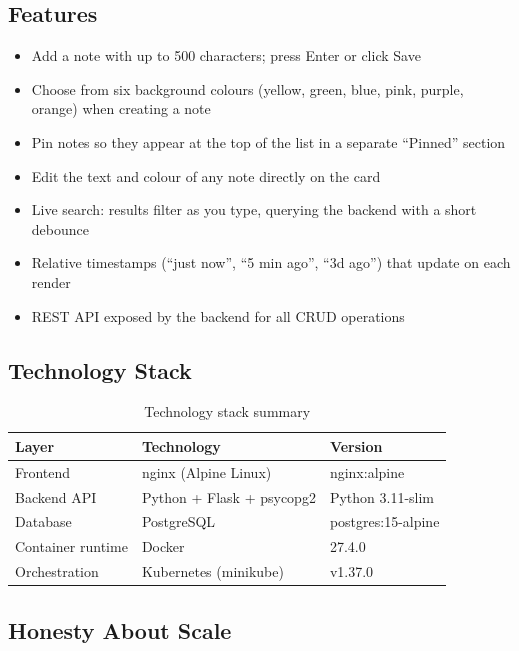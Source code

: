 \documentclass[12pt,a4paper]{article}
\begin{document}
\subsection{Features}

\begin{itemize}
    \item Add a note with up to 500 characters; press Enter or click Save
    \item Choose from six background colours (yellow, green, blue, pink, purple, orange) when creating a note
    \item Pin notes so they appear at the top of the list in a separate ``Pinned'' section
    \item Edit the text and colour of any note directly on the card
    \item Live search: results filter as you type, querying the backend with a short debounce
    \item Relative timestamps (``just now'', ``5 min ago'', ``3d ago'') that update on each render
    \item REST API exposed by the backend for all CRUD operations
\end{itemize}

\subsection{Technology Stack}

\begin{table}[h]
\centering
\begin{tabular}{@{}lll@{}}
\toprule
\textbf{Layer} & \textbf{Technology} & \textbf{Version} \\
\midrule
Frontend        & nginx (Alpine Linux)            & nginx:alpine \\
Backend API     & Python + Flask + psycopg2       & Python 3.11-slim \\
Database        & PostgreSQL                      & postgres:15-alpine \\
Container runtime & Docker                        & 27.4.0 \\
Orchestration   & Kubernetes (minikube)           & v1.37.0 \\
\bottomrule
\end{tabular}
\caption{Technology stack summary}
\end{table}

\subsection{Honesty About Scale}
\end{document}
